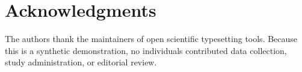 \section*{Acknowledgments}
The authors thank the maintainers of open scientific typesetting tools. Because this is a synthetic demonstration, no individuals contributed data collection, study administration, or editorial review.
